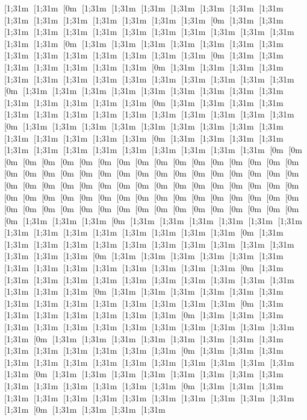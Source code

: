[1;31m [1;31m [0m [1;31m [1;31m [1;31m [1;31m [1;31m [1;31m [1;31m [1;31m [1;31m [1;31m [1;31m [1;31m [1;31m [1;31m [0m [1;31m [1;31m [1;31m [1;31m [1;31m [1;31m [1;31m [1;31m [1;31m [1;31m [1;31m [1;31m [1;31m [1;31m [0m [1;31m [1;31m [1;31m [1;31m [1;31m [1;31m [1;31m [1;31m [1;31m [1;31m [1;31m [1;31m [1;31m [1;31m [0m [1;31m [1;31m [1;31m [1;31m [1;31m [1;31m [1;31m [0m [1;31m [1;31m [1;31m [1;31m [1;31m [1;31m [1;31m [1;31m [1;31m [1;31m [1;31m [1;31m [1;31m [1;31m [0m [1;31m [1;31m [1;31m [1;31m [1;31m [1;31m [1;31m [1;31m [1;31m [1;31m [1;31m [1;31m [1;31m [1;31m [0m [1;31m [1;31m [1;31m [1;31m [1;31m [1;31m [1;31m [1;31m [1;31m [1;31m [1;31m [1;31m [1;31m [1;31m [0m [1;31m [1;31m [1;31m [1;31m [1;31m [1;31m [1;31m [1;31m [1;31m [1;31m [1;31m [1;31m [1;31m [1;31m [0m [1;31m [1;31m [1;31m [1;31m [1;31m [1;31m [1;31m [1;31m [1;31m [1;31m [1;31m [1;31m [1;31m [0m [0m [0m [0m [0m [0m [0m [0m [0m [0m [0m [0m [0m [0m [0m [0m [0m [0m [0m [0m [0m [0m [0m [0m [0m [0m [0m [0m [0m [0m [0m [0m [0m [0m [0m [0m [0m [0m [0m [0m [0m [0m [0m [0m [0m [0m [0m [0m [0m [0m [0m [0m [0m [0m [0m [0m [0m [0m [0m [0m [0m [0m [0m [0m [0m [0m [0m [0m [0m [0m [0m [0m [0m [0m [0m [0m [0m [0m [0m [0m [0m [0m [0m [1;31m [1;31m [1;31m [0m [1;31m [1;31m [1;31m [1;31m [1;31m [1;31m [1;31m [1;31m [1;31m [1;31m [1;31m [1;31m [1;31m [1;31m [0m [1;31m [1;31m [1;31m [1;31m [1;31m [1;31m [1;31m [1;31m [1;31m [1;31m [1;31m [1;31m [1;31m [1;31m [0m [1;31m [1;31m [1;31m [1;31m [1;31m [1;31m [1;31m [1;31m [1;31m [1;31m [1;31m [1;31m [1;31m [1;31m [0m [1;31m [1;31m [1;31m [1;31m [1;31m [1;31m [1;31m [1;31m [1;31m [1;31m [1;31m [1;31m [1;31m [1;31m [0m [1;31m [1;31m [1;31m [1;31m [1;31m [1;31m [1;31m [1;31m [1;31m [1;31m [1;31m [1;31m [1;31m [1;31m [0m [1;31m [1;31m [1;31m [1;31m [1;31m [1;31m [1;31m [0m [1;31m [1;31m [1;31m [1;31m [1;31m [1;31m [1;31m [1;31m [1;31m [1;31m [1;31m [1;31m [1;31m [1;31m [0m [1;31m [1;31m [1;31m [1;31m [1;31m [1;31m [1;31m [1;31m [1;31m [1;31m [1;31m [1;31m [1;31m [1;31m [0m [1;31m [1;31m [1;31m [1;31m [1;31m [1;31m [1;31m [1;31m [1;31m [1;31m [1;31m [1;31m [1;31m [1;31m [0m [1;31m [1;31m [1;31m [1;31m [1;31m [1;31m [1;31m [1;31m [1;31m [1;31m [1;31m [1;31m [1;31m [1;31m [0m [1;31m [1;31m [1;31m [1;31m [1;31m [1;31m [1;31m [1;31m [1;31m [1;31m [1;31m [1;31m [1;31m [1;31m [0m [1;31m [1;31m [1;31m [1;31m 